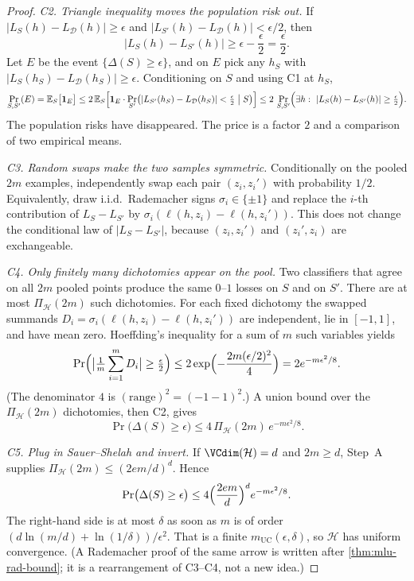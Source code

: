 \begin{proof}
\textit{C2. Triangle inequality moves the population risk out.}
If $\lvert L_S(h)-L_{\mathcal{D}}(h)\rvert\ge\epsilon$ and $\lvert L_{S'}(h)-L_{\mathcal{D}}(h)\rvert<\epsilon/2$, then
\[
\lvert L_S(h)-L_{S'}(h)\rvert
\ge
\epsilon-\frac{\epsilon}{2}
=
\frac{\epsilon}{2}.
\]
Let $E$ be the event $\{\Delta(S)\ge\epsilon\}$, and on $E$ pick any $h_S$ with $\lvert L_S(h_S)-L_{\mathcal{D}}(h_S)\rvert\ge\epsilon$. Conditioning on $S$ and using C1 at $h_S$,
\[
\Pr_{S,S'}(E)
=
\mathbb{E}_S\bigl[\mathbf{1}_E\bigr]
\le
2\,\mathbb{E}_S\Bigl[\mathbf{1}_E\cdot\Pr_{S'}\bigl(\lvert L_{S'}(h_S)-L_{\mathcal{D}}(h_S)\rvert<\tfrac{\epsilon}{2}\bigm|S\bigr)\Bigr]
\le
2\,\Pr_{S,S'}\Bigl(\exists h:\ \lvert L_S(h)-L_{S'}(h)\rvert\ge\tfrac{\epsilon}{2}\Bigr).
\]
The population risks have disappeared. The price is a factor $2$ and a comparison of two empirical means.

\textit{C3. Random swaps make the two samples symmetric.}
Conditionally on the pooled $2m$ examples, independently swap each pair $(z_i,z_i')$ with probability $1/2$. Equivalently, draw i.i.d.\ Rademacher signs $\sigma_i\in\{\pm1\}$ and replace the $i$-th contribution of $L_S-L_{S'}$ by $\sigma_i(\ell(h,z_i)-\ell(h,z_i'))$. This does not change the conditional law of $\lvert L_S-L_{S'}\rvert$, because $(z_i,z_i')$ and $(z_i',z_i)$ are exchangeable.

\textit{C4. Only finitely many dichotomies appear on the pool.}
Two classifiers that agree on all $2m$ pooled points produce the same $0$--$1$ losses on $S$ and on $S'$. There are at most $\Pi_{\mathcal{H}}(2m)$ such dichotomies. For each fixed dichotomy the swapped summands $D_i=\sigma_i(\ell(h,z_i)-\ell(h,z_i'))$ are independent, lie in $[-1,1]$, and have mean zero. Hoeffding's inequality for a sum of $m$ such variables yields
\[
\Pr\Bigl(\bigl\lvert\tfrac1m\sum_{i=1}^m D_i\bigr\rvert\ge\tfrac{\epsilon}{2}\Bigr)
\le
2\exp\Bigl(-\frac{2m(\epsilon/2)^2}{4}\Bigr)
=
2e^{-m\epsilon^2/8}.
\]
(The denominator $4$ is $(\mathrm{range})^2=(-1-1)^2$.) A union bound over the $\Pi_{\mathcal{H}}(2m)$ dichotomies, then C2, gives
\[
\Pr\bigl(\Delta(S)\ge\epsilon\bigr)
\le
4\,\Pi_{\mathcal{H}}(2m)\,e^{-m\epsilon^2/8}.
\]

\textit{C5. Plug in Sauer--Shelah and invert.}
If $\VCdim(\mathcal{H})=d$ and $2m\ge d$, Step~A supplies $\Pi_{\mathcal{H}}(2m)\le(2em/d)^d$. Hence
\[
\Pr\bigl(\Delta(S)\ge\epsilon\bigr)
\le
4\Bigl(\frac{2em}{d}\Bigr)^{d}e^{-m\epsilon^2/8}.
\]
The right-hand side is at most $\delta$ as soon as $m$ is of order $(d\ln(m/d)+\ln(1/\delta))/\epsilon^2$. That is a finite $m_{\mathrm{UC}}(\epsilon,\delta)$, so $\mathcal{H}$ has uniform convergence. (A Rademacher proof of the same arrow is written after \cref{thm:mlu-rad-bound}; it is a rearrangement of C3--C4, not a new idea.)


\end{proof}
